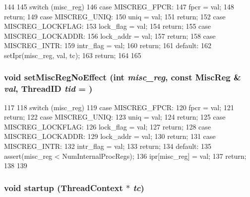 \begin{DoxyCode}
144 {
145     switch (misc_reg) {
146       case MISCREG_FPCR:
147         fpcr = val;
148         return;
149       case MISCREG_UNIQ:
150         uniq = val;
151         return;
152       case MISCREG_LOCKFLAG:
153         lock_flag = val;
154         return;
155       case MISCREG_LOCKADDR:
156         lock_addr = val;
157         return;
158       case MISCREG_INTR:
159         intr_flag = val;
160         return;
161       default:
162         setIpr(misc_reg, val, tc);
163         return;
164     }
165 }
\end{DoxyCode}
\hypertarget{classAlphaISA_1_1ISA_ab8dd4afdd4e652ca191b235505691f68}{
\subsubsection[{setMiscRegNoEffect}]{\setlength{\rightskip}{0pt plus 5cm}void setMiscRegNoEffect (int {\em misc\_\-reg}, \/  const {\bf MiscReg} \& {\em val}, \/  {\bf ThreadID} {\em tid} = {})}}
\label{classAlphaISA_1_1ISA_ab8dd4afdd4e652ca191b235505691f68}



\begin{DoxyCode}
117 {
118     switch (misc_reg) {
119       case MISCREG_FPCR:
120         fpcr = val;
121         return;
122       case MISCREG_UNIQ:
123         uniq = val;
124         return;
125       case MISCREG_LOCKFLAG:
126         lock_flag = val;
127         return;
128       case MISCREG_LOCKADDR:
129         lock_addr = val;
130         return;
131       case MISCREG_INTR:
132         intr_flag = val;
133         return;
134       default:
135         assert(misc_reg < NumInternalProcRegs);
136         ipr[misc_reg] = val;
137         return;
138     }
139 }
\end{DoxyCode}
\hypertarget{classAlphaISA_1_1ISA_a769e733729615c529fdb54f538f11dba}{
\subsubsection[{startup}]{\setlength{\rightskip}{0pt plus 5cm}void startup ({\bf ThreadContext} $\ast$ {\em tc})}}
\label{classAlphaISA_1_1ISA_a769e733729615c529fdb54f538f11dba}



